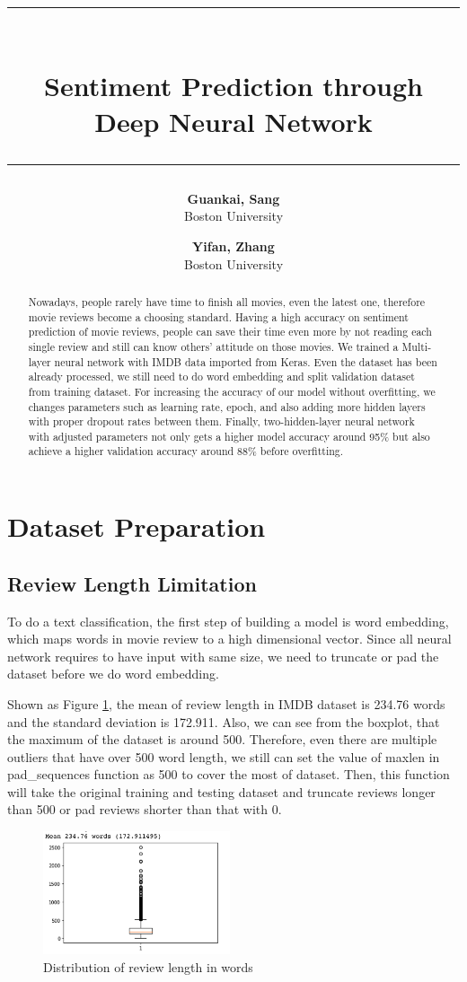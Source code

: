 \documentclass{article}
\author{
 \textbf{Guankai, Sang}\\
  Boston University
  \and
 \textbf{Yifan, Zhang}\\ 
 Boston University
}
\title{\rule{\textwidth}{4pt}\\\textbf{Sentiment Prediction through Deep Neural Network}\\\rule{\textwidth}{1pt}}
\begin{document}
\maketitle
\begin{abstract}
  Nowadays, people rarely have time to finish all movies, even the latest one, therefore movie reviews become a choosing standard. Having a high accuracy on sentiment prediction of movie reviews, people can save their time even more  by not reading each single review and still can know others' attitude on those movies. We trained a Multi-layer neural network with IMDB data imported from Keras. Even the dataset has been already processed, we still need to do word embedding and split validation dataset from training dataset. For increasing the accuracy of our model without overfitting, we changes parameters such as learning rate, epoch, and also adding more hidden layers with proper dropout rates between them. Finally, two-hidden-layer neural network with adjusted parameters not only gets a higher model accuracy around 95\% but also achieve a higher validation accuracy around 88\% before overfitting.
\end{abstract}
\section{Dataset Preparation}
\subsection{Review Length Limitation}	
To do a text classification, the first step of building a model is word embedding, which maps words in movie review to a high dimensional vector. Since all neural network requires to have input with same size, we need to truncate or pad the dataset before we do word embedding. 
\vspace{5.5pt}

\noindent Shown as Figure \ref{fig:length}, the mean of review length in IMDB dataset is 234.76 words and the standard deviation is 172.911. Also, we can see from the boxplot, that the maximum of the dataset is around 500. Therefore, even there are multiple outliers that have over 500 word length, we still can set the value of maxlen in pad\_sequences function as 500 to cover the most of dataset. Then, this function will take the original training and testing dataset and truncate reviews longer than 500 or pad reviews shorter than that with 0. 
\FloatBarrier
\begin{figure}[htb]
    \centering
    \includegraphics[width=5.5cm]{length}
    \caption{Distribution of review length in words}
    \label{fig:length}
\end{figure}
\FloatBarrier
\end{document}
